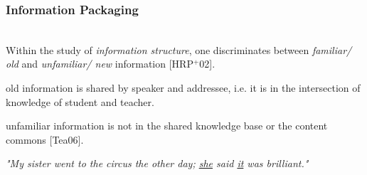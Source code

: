 \begin{frame}
  \frametitle{Information Packaging}
  \begin{module}[id=infoPackaging]
  \\
    \noindent
    Within the study of \textit{information structure}, one discriminates between \textit{familiar/ old} and \textit{unfamiliar/ new} information [HRP$^+$02].\\

    \begin{definition}  {old} {information} is shared by speaker and addressee, i.e. it is in the intersection of knowledge of student and teacher.\end{definition}
    \begin{definition}  {unfamiliar} {information} is not in the shared knowledge base or the content commons [Tea06]. \end{definition}

  \begin{center}
  \textit{"My sister went to the circus the other day; \underline{she} said \underline{it} was brilliant."}\\
  \end{center}
  \end{module}
\end{frame}
